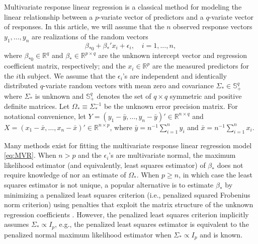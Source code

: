 \documentclass[12pt]{article}
\begin{document}
Multivariate response linear regression is a classical method for modeling the linear relationship between a $p$-variate vector of predictors and a $q$-variate vector of responses. In this article, we will assume that the $n$ observed response vectors $y_1, \dots, y_n$ are realizations of the random vectors
\begin{equation} \label{eq:MVR}
\beta_{*0} + \beta_*'x_i + \epsilon_i, \quad i = 1, \dots, n, 
\end{equation}
where $\beta_{*0} \in \mathbb{R}^{q}$ and $\beta_* \in \mathbb{R}^{p \times q}$ are the unknown intercept vector and regression coefficient matrix, respectively; and the $x_i \in \mathbb{R}^p$ are the measured predictors for the $i$th subject. We assume that the $\epsilon_i$'s are independent and identically distributed $q$-variate random vectors with mean zero and covariance $\Sigma_* \in \mathbb{S}^q_+$ where $\Sigma_*$ is unknown and $\mathbb{S}_+^q$ denotes the set of $q \times q$ symmetric and positive definite matrices. Let $\Omega_* \equiv \Sigma_*^{-1}$ be the unknown error precision matrix. For notational convenience, let $Y = (y_1 - \bar{y}, \dots, y_n - \bar{y})' \in \mathbb{R}^{n \times q}$ and $X =  (x_1 - \bar{x}, \dots, x_n - \bar{x})' \in \mathbb{R}^{n \times p}$, where $\bar{y} = n^{-1} \sum_{i=1}^n y_i$ and $\bar{x} = n^{-1} \sum_{i=1}^n x_i$. 

Many methods exist for fitting the multivariate response linear regression model \eqref{eq:MVR}. When $n > p$ and the $\epsilon_i$'s are multivariate normal, the maximum likelihood estimator (and equivalently, least squares estimator) of $\beta_*$ does not require knowledge of nor an estimate of $\Omega_*$. When $p \geq n$, in which case the least squares estimator is not unique, a popular alternative is to estimate $\beta_*$ by minimizing a penalized least squares criterion (i.e., penalized squared Frobenius norm criterion) using penalties that exploit the matrix structure of the unknown regression coefficients \citep{turlach2005simultaneous,yuan2007dimension,obozinski2011support}. However, the penalized least squares criterion implicitly assumes $\Sigma_* \propto I_p$, e.g., the penalized least squares estimator is equivalent to the penalized normal maximum likelihood estimator when $\Sigma_* \propto I_p$ and is known. %
\end{document}
